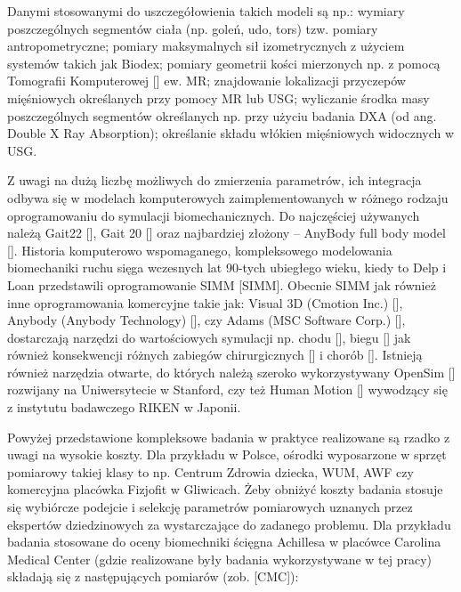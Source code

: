 Danymi stosowanymi do uszczegółowienia takich modeli są np.: wymiary poszczególnych segmentów ciała (np. goleń, udo, tors) tzw. pomiary antropometryczne; pomiary maksymalnych sił izometrycznych z użyciem systemów takich jak Biodex; pomiary geometrii kości mierzonych np. z pomocą Tomografii Komputerowej [] ew. MR; znajdowanie lokalizacji przyczepów mięśniowych określanych przy pomocy MR lub USG; wyliczanie środka masy poszczególnych segmentów określanych np. przy użyciu badania DXA (od ang. Double X Ray Absorption); określanie składu włókien mięśniowych widocznych w USG.

Z uwagi na dużą liczbę możliwych do zmierzenia parametrów, ich integracja odbywa się w modelach komputerowych zaimplementowanych w różnego rodzaju oprogramowaniu do symulacji biomechanicznych. Do najczęściej używanych należą Gait22 [], Gait 20 [] oraz najbardziej złożony -- AnyBody full body model []. Historia komputerowo wspomaganego, kompleksowego modelowania biomechaniki ruchu sięga wczesnych lat 90-tych ubiegłego wieku, kiedy to Delp i Loan przedstawili oprogramowanie SIMM [SIMM]. Obecnie SIMM jak również inne oprogramowania komercyjne takie jak: Visual 3D (Cmotion Inc.) [], Anybody (Anybody Technology) [], czy Adams (MSC Software Corp.) [], dostarczają narzędzi do wartościowych symulacji np. chodu [], biegu [] jak również konsekwencji różnych zabiegów chirurgicznych [] i chorób []. Istnieją również narzędzia otwarte, do których należą szeroko wykorzystywany OpenSim [] rozwijany na Uniwersytecie w Stanford, czy też Human Motion [] wywodzący się z instytutu badawczego RIKEN w Japonii.

Powyżej przedstawione kompleksowe badania w praktyce realizowane są rzadko z uwagi na wysokie koszty. Dla przykładu w Polsce, ośrodki wyposarzone w sprzęt pomiarowy takiej klasy to np. Centrum Zdrowia dziecka, WUM, AWF czy komercyjna placówka Fizjofit w Gliwicach. Żeby obniżyć koszty badania stosuje się wybiórcze podejcie i selekcję parametrów pomiarowych uznanych przez ekspertów dziedzinowych za wystarczające do zadanego problemu. Dla przykładu badania stosowane do oceny biomechniki ścięgna Achillesa w placówce Carolina Medical Center (gdzie realizowane były badania wykorzystywane w tej pracy) składają się z następujących pomiarów (zob. [CMC]):

